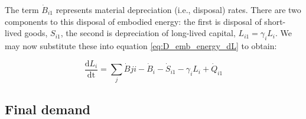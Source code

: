 \documentclass[authoryear,preprint,review,12pt]{elsarticle}
\begin{document}
The term $\dot{B}_{i1}$ represents material depreciation (i.e., disposal) rates. There are two components to this disposal of embodied energy: the first is disposal of short-lived goods, $S_{i1}$, the second is depreciation of long-lived capital, $L_{i1} = \gamma_i L_i$. We may now substitute these into equation \ref{eq:D_emb_energy_dL} to obtain:

\begin{equation}\label{eq:D_dep}
\frac{\textrm{d}L_{i}}{\textrm{dt}} = \sum_{j}\dot{B}{ji} - \dot{B}_{i} - \dot{S}_{i1} - \gamma_i L_i + \dot{Q}_{i1}
\end{equation}

%
%
%
%


\subsection{Final demand}
\end{document}
